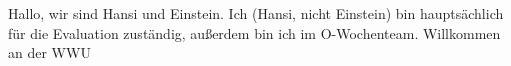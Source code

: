 \begin{multicols*}{2}
{Hallo, wir sind Hansi und Einstein. Ich (Hansi, nicht Einstein) bin hauptsächlich für die Evaluation zuständig, außerdem bin ich im O-Wochenteam. 
	Willkommen an der WWU}
\vspace{0.5cm}



\end{multicols*}

